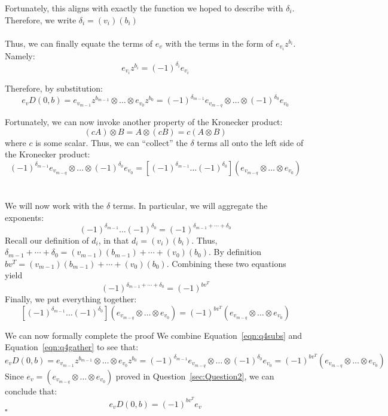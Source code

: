 \documentclass[letterpaper]{article}
\newcommand*{\QED}{\hfill\ensuremath{\square}}%
\begin{document}
Fortunately, this aligns with exactly the function we hoped to describe with $ \delta_i $.
Therefore, we write $ \delta_i = (v_i)(b_i) $
\\ \\
Thus, we can finally equate the terms of $ e_v $ with the terms in the form of $ e_{v_i} z^{b_i} $.
Namely:
\[
e_{v_i} z^{b_i} = {(-1)}^{\delta_i} e_{v_i}
\]

Therefore, by substitution:
\begin{equation}
\label{eqn:q4subs}
e_v D(0, b) = e_{v_{m - 1}} z^{b_{m - 1}} \otimes \ldots \otimes e_{v_0}z^{b_{0}} = {(-1)}^{\delta_{m - 1}} e_{v_{m - q}} \otimes \ldots \otimes {(-1)}^{\delta_0} e_{v_0}
\end{equation}

Fortunately, we can now invoke another property of the Kronecker product:
\begin{equation}
\label{eqn:kronecker-scalar}
    (cA) \otimes B = A \otimes (cB) = c(A \otimes B)
\end{equation}
where $ c $ is some scalar.
Thus, we can ``collect'' the $ \delta $ terms all onto the left side of the Kronecker product:
\[
 {(-1)}^{\delta_{m - 1}} e_{v_{m - q}} \otimes \ldots \otimes {(-1)}^{\delta_0} e_{v_0} = \left[{(-1)}^{\delta_{m - 1}} \ldots {(-1)}^{\delta_0} \right] \left(e_{v_{m - q}} \otimes \ldots \otimes e_{v_0} \right)
\]
\\ \\
We will now work with the $ \delta $ terms.
In particular, we will aggregate the exponents:
\[
{(-1)}^{\delta_{m - 1}} \ldots {(-1)}^{\delta_0} = {(-1)}^{\delta_{m - 1} + \cdots + \delta_0}
\]
Recall our definition of $ d_i $, in that $ d_i = (v_i)(b_i) $.
Thus, $ \delta_{m - 1} + \cdots + \delta_0 = (v_{m - 1})(b_{m - 1}) + \cdots + (v_0)(b_0) $.
By definition $ b v^T = (v_{m - 1})(b_{m - 1}) + \cdots + (v_0)(b_0) $.
Combining these two equations yield
\[
{(-1)}^{\delta_{m - 1} + \cdots + \delta_0} = {(-1)}^{b v^T}
\]
Finally, we put everything together:
\begin{equation}
\label{eqn:q4gather}
    \left[{(-1)}^{\delta_{m - 1}} \ldots {(-1)}^{\delta_0} \right] \left(e_{v_{m - q}} \otimes \ldots \otimes e_{v_0} \right) = {(-1)}^{b v^T} \left(e_{v_{m - q}} \otimes \ldots \otimes e_{v_0} \right)
\end{equation}

We can now formally complete the proof
We combine Equation~\ref{eqn:q4subs} and Equation~\ref{eqn:q4gather} to see that:
\[
e_v D(0, b) = e_{v_{m - 1}} z^{b_{m - 1}} \otimes \ldots \otimes e_{v_0}z^{b_{0}} = {(-1)}^{\delta_{m - 1}} e_{v_{m - q}} \otimes \ldots \otimes {(-1)}^{\delta_0} e_{v_0} = {(-1)}^{b v^T} \left(e_{v_{m - q}} \otimes \ldots \otimes e_{v_0} \right)
\]
Since $ e_v = \left(e_{v_{m - q}} \otimes \ldots \otimes e_{v_0} \right) $ proved in Question~\ref{sec:Question2}, we can conclude that:
\[
e_v D(0, b) = {(-1)}^{b v^T} e_v
\]
\QED{}
\end{document}
